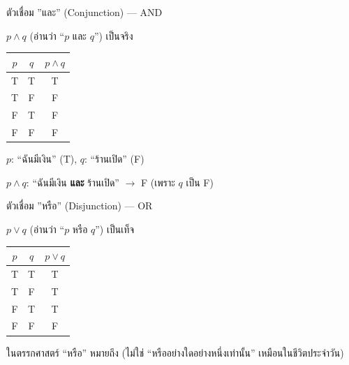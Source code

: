 \documentclass[11pt, aspectratio=169]{beamer}
\begin{document}
\begin{frame}{ตัวเชื่อม ''และ'' (Conjunction) — AND}
  \begin{explanation}[นิยาม]
    $p \land q$ (อ่านว่า ``$p$ และ $q$'') เป็นจริง 

    \medskip
    \begin{center}
      \begin{tabular}{cc|c}
        $p$ & $q$ & $p \land q$ \\
        \hline
        T & T & T \\
        T & F & F \\
        F & T & F \\
        F & F & F
      \end{tabular}
    \end{center}
  \end{explanation}

  \begin{exambox}[ตัวอย่าง]
    $p$: ``ฉันมีเงิน'' (T), \quad $q$: ``ร้านเปิด'' (F)

    $p \land q$: ``ฉันมีเงิน \textbf{และ} ร้านเปิด'' $\rightarrow$ F (เพราะ $q$ เป็น F)
  \end{exambox}
\end{frame}

\begin{frame}{ตัวเชื่อม ''หรือ'' (Disjunction) — OR}
  \begin{explanation}[นิยาม]
    $p \lor q$ (อ่านว่า ``$p$ หรือ $q$'') เป็นเท็จ 

    \medskip
    \begin{center}
      \begin{tabular}{cc|c}
        $p$ & $q$ & $p \lor q$ \\
        \hline
        T & T & T \\
        T & F & T \\
        F & T & T \\
        F & F & F
      \end{tabular}
    \end{center}
  \end{explanation}

  \begin{intuition}[ข้อสังเกต]
    ในตรรกศาสตร์ ``หรือ'' หมายถึง 
    (ไม่ใช่ ``หรืออย่างใดอย่างหนึ่งเท่านั้น'' เหมือนในชีวิตประจำวัน)
  \end{intuition}
\end{frame}
\end{document}
